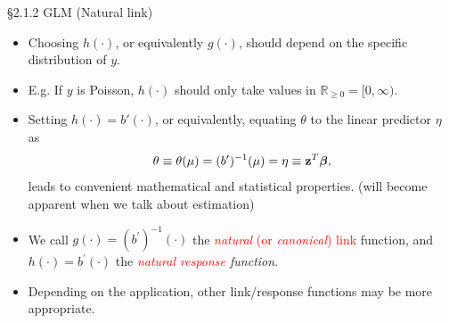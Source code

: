\documentclass{beamer}
\newenvironment{wideitemize}%
  {\begin{itemize}%
    \setlength{\parskip}{1em}}%
  {\end{itemize}}
\begin{document}
\begin{frame}{\S2.1.2 GLM (Natural link)}

\begin{wideitemize}
\item
Choosing $h(\cdot)$, or equivalently $g(\cdot)$, should depend on the specific distribution of $y$. 

\item E.g. If $y$ is Poisson, $h(\cdot)$ should only take values in $\mathbb{R}_{\geq 0} = [0, \infty)$. 
\item

Setting  $h(\cdot) = b'(\cdot)$, or equivalently, equating $\theta$  to the linear predictor $\eta$ as
\[
\theta\equiv \theta(\mu)= (b')^{-1} (\mu)= \eta\equiv \textbf{z}^T\mbox{\boldmath $\beta$},
\]
leads to convenient mathematical and statistical properties. (will become apparent when we talk about estimation)


\item
We call $g(\cdot)=(b^\prime)^{-1}(\cdot)$ the \textcolor{red}{\textit{natural} (or \textit{canonical}) link} function,
and $h (\cdot)=b^{\prime}(\cdot)$ the \textit{\textcolor{red}{natural response} function}.

\item Depending on the application, other link/response functions may be more appropriate.

\end{wideitemize}
\end{frame}
\end{document}
